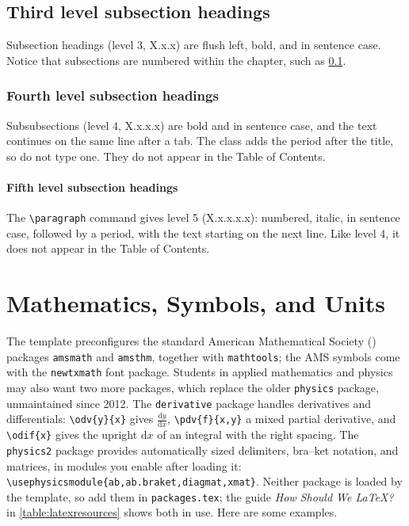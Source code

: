 \subsection{Third level subsection headings}
\label{subsec:subsections}
Subsection headings (level 3, X.x.x) are flush left, bold, and in sentence case. Notice that subsections are numbered within the chapter, such as \cref{subsec:subsections}.

\subsubsection{Fourth level subsection headings}
\label{subsubsec:subsubsections}
Subsubsections (level 4, X.x.x.x) are bold and in sentence case, and the text continues on the same line after a tab. The class adds the period after the title, so do not type one. They do not appear in the Table of Contents.

\paragraph{Fifth level subsection headings}
The \verb+\paragraph+ command gives level 5 (X.x.x.x.x): numbered, italic, in sentence case, followed by a period, with the text starting on the next line. Like level 4, it does not appear in the Table of Contents.

\section{Mathematics, Symbols, and Units}
\label{sec:math}

The template preconfigures the standard American Mathematical Society (\AmS) packages \texttt{amsmath} and \texttt{amsthm}, together with \texttt{mathtools}; the AMS symbols come with the \texttt{newtxmath} font package. Students in applied mathematics and physics may also want two more packages, which replace the older \texttt{physics} package, unmaintained since 2012. The \texttt{derivative} package handles derivatives and differentials: \verb+\odv{y}{x}+ gives $\frac{\mathrm{d}y}{\mathrm{d}x}$, \verb+\pdv{f}{x,y}+ a mixed partial derivative, and \verb+\odif{x}+ gives the upright $\mathrm{d}x$ of an integral with the right spacing. The \texttt{physics2} package provides automatically sized delimiters, bra--ket notation, and matrices, in modules you enable after loading it: \verb+\usephysicsmodule{ab,ab.braket,diagmat,xmat}+. Neither package is loaded by the template, so add them in \texttt{packages.tex}; the guide \emph{How Should We \LaTeX?} in \cref{table:latexresources} shows both in use. Here are some examples.

